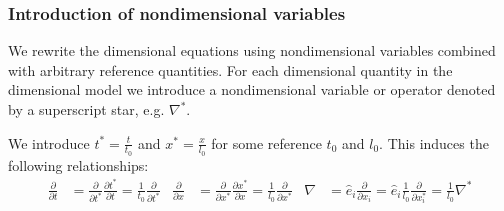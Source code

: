 \documentclass[letterpaper,11pt,nointlimits,reqno]{amsart}
\begin{document}
\subsubsection{Introduction of nondimensional variables}
\label{sec:intronondim}

We rewrite the dimensional equations using nondimensional variables
combined with arbitrary reference quantities.  For each dimensional
quantity in the dimensional model we introduce a nondimensional variable
or operator denoted by a superscript star, e.g. $\nabla^{*}$.

We introduce $t^{*}=\frac{t}{t_{0}}$ and $x^{*}=\frac{x}{l_{0}}$ for some
reference $t_{0}$ and $l_{0}$.  This induces the following relationships:
\begin{align}
  \frac{\partial{}}{\partial{}t}
  &=
  \frac{\partial{}}{\partial{}t^{*}}
  \frac{\partial{}t^{*}}{\partial{}t}
  =
  \frac{1}{t_{0}}\frac{\partial}{\partial{}t^{*}}
  &
  \frac{\partial{}}{\partial{}x}
  &=
  \frac{\partial{}}{\partial{}x^{*}}
  \frac{\partial{}x^{*}}{\partial{}x}
  =
  \frac{1}{l_{0}}\frac{\partial}{\partial{}x^{*}}
  &
  \nabla
  &=
  \hat{e}_{i} \frac{\partial{}}{\partial{}x_{i}}
  =
  \hat{e}_{i} \frac{1}{l_{0}} \frac{\partial}{\partial{}x^{*}_{i}}
  =
  \frac{1}{l_{0}} \nabla^{*}
  \label{eq:nondim_derivops}
\end{align}
\end{document}
